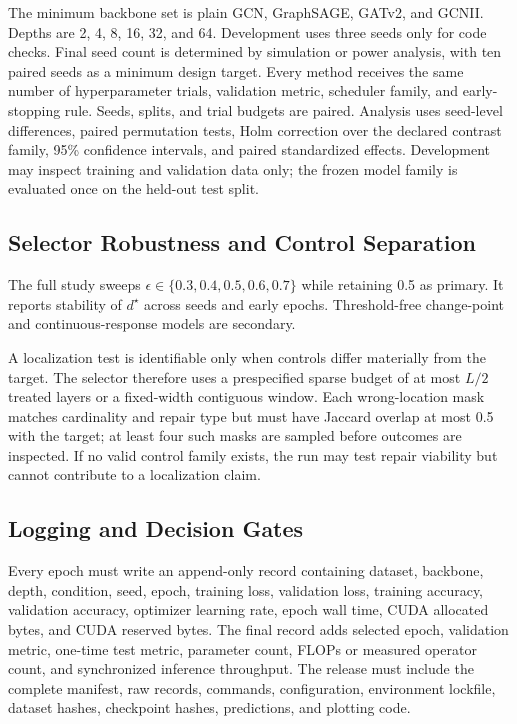 \documentclass[journal]{IEEEtran}
\begin{document}
The minimum backbone set is plain GCN, GraphSAGE, GATv2, and GCNII. Depths are 2, 4, 8, 16, 32, and 64. Development uses three seeds only for code checks. Final seed count is determined by simulation or power analysis, with ten paired seeds as a minimum design target. Every method receives the same number of hyperparameter trials, validation metric, scheduler family, and early-stopping rule. Seeds, splits, and trial budgets are paired. Analysis uses seed-level differences, paired permutation tests, Holm correction over the declared contrast family, 95\% confidence intervals, and paired standardized effects. Development may inspect training and validation data only; the frozen model family is evaluated once on the held-out test split.

\subsection{Selector Robustness and Control Separation}

The full study sweeps $\epsilon\in\{0.3,0.4,0.5,0.6,0.7\}$ while retaining 0.5 as primary. It reports stability of $d^\star$ across seeds and early epochs. Threshold-free change-point and continuous-response models are secondary.

A localization test is identifiable only when controls differ materially from the target. The selector therefore uses a prespecified sparse budget of at most $L/2$ treated layers or a fixed-width contiguous window. Each wrong-location mask matches cardinality and repair type but must have Jaccard overlap at most 0.5 with the target; at least four such masks are sampled before outcomes are inspected. If no valid control family exists, the run may test repair viability but cannot contribute to a localization claim.

\subsection{Logging and Decision Gates}

Every epoch must write an append-only record containing dataset, backbone, depth, condition, seed, epoch, training loss, validation loss, training accuracy, validation accuracy, optimizer learning rate, epoch wall time, CUDA allocated bytes, and CUDA reserved bytes. The final record adds selected epoch, validation metric, one-time test metric, parameter count, FLOPs or measured operator count, and synchronized inference throughput. The release must include the complete manifest, raw records, commands, configuration, environment lockfile, dataset hashes, checkpoint hashes, predictions, and plotting code.
\end{document}
